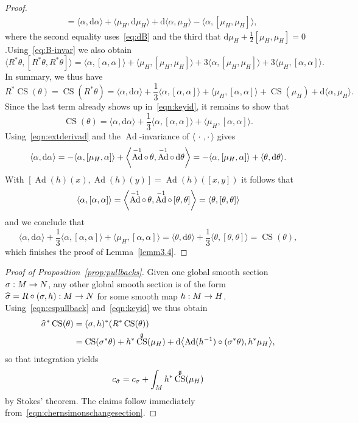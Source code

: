 \documentclass[AHL,Unicode,longabstracts]{cedram}
\newcommand{\si}{\sigma}
\newcommand{\B}[2]{\langle#1,#2\rangle}
\DeclareMathOperator{\CS}{CS}
\DeclareMathOperator{\Ad}{Ad}
\renewcommand*{\d}{\mathrm{d}}
\newcommand{\fkg}{\mathfrak{g}}
\renewcommand*{\to}{\mathchoice{\longrightarrow}{\rightarrow}{\rightarrow}{\rightarrow}}
\let\originalleft\left
\let\originalright\right
\renewcommand{\left}{\mathopen{}\mathclose\bgroup\originalleft}
\renewcommand{\right}{\aftergroup\egroup\originalright}
\let\oldhat\hat
\renewcommand*{\hat}[1]{\mathchoice{\widehat{#1}}{\widehat{#1}}{\oldhat{#1}}{\oldhat{#1}}}
\begin{document}
\begin{proof}
\begin{align*}
&=\B{\alpha}{\d\alpha}+\B{\mu_H}{\d \mu_H}+\d\B{\alpha}{\mu_H}-\B{\alpha}{[\mu_H,\mu_H]},
\end{align*}
where the second equality uses~\eqref{eq:dB} and the third that $\d\mu_H+\frac{1}{2}[\mu_H,\mu_H]=0$.\linebreak Using~\eqref{eq:B-invar} we also obtain
\[
\B{R^*\theta}{[R^*\theta,R^*\theta]}=\B{\alpha}{[\alpha,\alpha]}+\B{\mu_H}{[\mu_H,\mu_H]}+3\B{\alpha}{[\mu_H,\mu_H]}+3\B{\mu_H}{[\alpha,\alpha]}.
\]
In summary, we thus have
\[
R^*\CS(\theta)=\CS(R^*\theta)=\B{\alpha}{\d\alpha}+\frac{1}{3}\B{\alpha}{[\alpha,\alpha]}+
\B{\mu_H}{[\alpha,\alpha]}+\CS(\mu_H)+\d\B{\alpha}{\mu_H}.
\]
Since the last term already shows up in~\eqref{eqn:keyid}, it remains to show that
\[
\CS(\theta)=\B{\alpha}{\d \alpha}+\frac{1}{3}\B{\alpha}{[\alpha,\alpha]}+\B{\mu_H}{[\alpha,\alpha]}.
\]
Using~\eqref{eqn:extderivad} and the $\Ad$-invariance of $\B{\,\cdot\,}{\cdot\,}$ gives
\[
\B{\alpha}{\d\alpha}=-\B{\alpha}{[\mu_H,\alpha]}+\left\langle\Ad^{-1}\circ\, \theta,\Ad^{-1}\circ\, \d\theta\right\rangle=-\B{\alpha}{[\mu_H,\alpha]}+\B{\theta}{\d\theta}.
\]
With $[\Ad(h)(x),\Ad(h)(y)]=\Ad(h)([x,y])$ it follows that
\[
\B{\alpha}{[\alpha,\alpha]}=\left\langle\Ad^{-1}\circ\, \theta,\Ad^{-1}\circ\, [\theta,\theta]\right\rangle=\B{\theta}{[\theta,\theta]}
\]
and we conclude that
\[
\B{\alpha}{\d \alpha}+\frac{1}{3}\B{\alpha}{[\alpha,\alpha]}+\B{\mu_H}{[\alpha,\alpha]}=\B{\theta}{\d\theta}+\frac{1}{3}\B{\theta}{[\theta,\theta]}=\CS(\theta),
\]
which finishes the proof of Lemma~\ref{lemm3.4}.
\end{proof}
\begin{proof}[Proof of Proposition~\ref{prop:pullbacks}]
Given one global smooth section $\si: M\to N$, any other global smooth section is of the form $\hat{\sigma}=R\circ (\sigma,h) : M \to N$ for some smooth map $h : M \to H$. Using~\eqref{eqn:cspullback} and~\eqref{eqn:keyid} we thus obtain
\begin{align*}
\hat{\sigma}^*\CS(\theta)&=(\sigma,h)^*\left(R^*\CS(\theta)\right)\\
&=\CS(\sigma^*\theta)+h^*\CS^\fkg(\mu_H)+\d\left\langle\Ad(h^{-1})\circ(\sigma^*\theta),h^*\mu_H\right\rangle,
\end{align*}
so that integration yields
\begin{equation}\label{eqn:chernsimonschangesection}
c_{\hat{\sigma}}=c_{\sigma}+\int_M h^*\CS^\fkg(\mu_H)
\end{equation}
by Stokes' theorem. The claims follow immediately from~\eqref{eqn:chernsimonschangesection}.
\end{proof}
\end{document}
